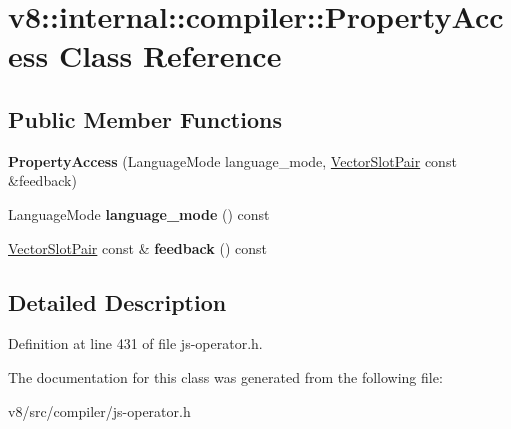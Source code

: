 \hypertarget{classv8_1_1internal_1_1compiler_1_1PropertyAccess}{}\section{v8\+:\+:internal\+:\+:compiler\+:\+:Property\+Access Class Reference}
\label{classv8_1_1internal_1_1compiler_1_1PropertyAccess}
\subsection*{Public Member Functions}
\begin{DoxyCompactItemize}
\item 
\mbox{\label{classv8_1_1internal_1_1compiler_1_1PropertyAccess_a52f983e8fb014ce74c8b97b474971a96}} 
{\bfseries Property\+Access} (Language\+Mode language\+\_\+mode, \mbox{\hyperlink{classv8_1_1internal_1_1VectorSlotPair}{Vector\+Slot\+Pair}} const \&feedback)
\item 
\mbox{\label{classv8_1_1internal_1_1compiler_1_1PropertyAccess_ad94f7fd08b5d86fe2cfcba70d8ceddce}} 
Language\+Mode {\bfseries language\+\_\+mode} () const
\item 
\mbox{\label{classv8_1_1internal_1_1compiler_1_1PropertyAccess_ad535c24fd88f42abd053194f98ce0de8}} 
\mbox{\hyperlink{classv8_1_1internal_1_1VectorSlotPair}{Vector\+Slot\+Pair}} const  \& {\bfseries feedback} () const
\end{DoxyCompactItemize}


\subsection{Detailed Description}


Definition at line 431 of file js-\/operator.\+h.



The documentation for this class was generated from the following file\+:\begin{DoxyCompactItemize}
\item 
v8/src/compiler/js-\/operator.\+h\end{DoxyCompactItemize}
